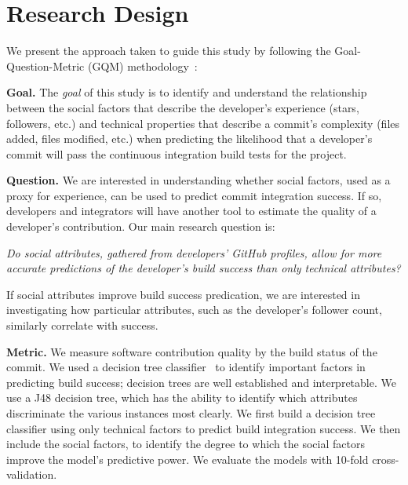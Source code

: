 \documentclass[10pt, conference]{IEEEtran}
\begin{document}
\section{Research Design}

We present the approach taken to guide this study by
following the Goal-Question-Metric (GQM) methodology~\cite{Basili84}:

\vspace{1ex}
\noindent\textbf{Goal.}
The \emph{goal} of this study is to identify and understand the relationship 
between the social factors that describe the
developer's experience (stars, followers, etc.) and technical properties that
describe a commit's complexity
(files added, files modified, etc.)
when predicting the likelihood that a developer's commit
will pass the continuous integration build tests for the project.

\vspace{1ex}
\noindent\textbf{Question.}
We are interested in understanding whether
social factors, used as a proxy for experience, can be used to predict
commit integration success. If so, 
developers and integrators will have another tool to estimate the quality
of a developer's contribution.
%
Our main research question is:

\vspace{1ex}
\noindent \emph{Do social attributes, gathered from developers' GitHub profiles, allow for
  more accurate predictions of the developer's build success than only technical
  attributes?}

If social attributes improve build success predication, we are
interested in investigating how particular attributes, such as the developer's
follower count, similarly correlate with success.

\vspace{1ex}
\noindent\textbf{Metric.} We measure software contribution quality by the
build status of the
commit. We used a decision tree classifier~\cite{Quinlan86} to identify
important factors in predicting build success;  decision trees are well
established and interpretable. We use a J48 decision tree, which
has the ability to identify which attributes 
discriminate the various instances most clearly.
We first build a
decision tree classifier using only technical factors to 
predict build integration
success.  We then include the social factors, to 
identify the degree to which the social factors improve the model's predictive
power.
We evaluate the models with 10-fold cross-validation. 
\end{document}
